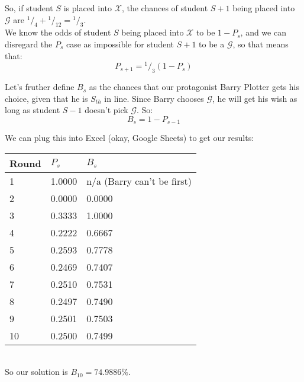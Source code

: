 \documentclass[10pt, letterpaper]{article}
\newcommand*\rfrac[2]{{}^{#1}\!/_{#2}}
\begin{document}
So, if student $S$ is placed into $\mathcal{X}$, the chances of student $S+1$ being placed into $\mathcal{G}$ are
$\rfrac{1}{4} + \rfrac{1}{12} = \rfrac{1}{3}$.\\

We know the odds of student $S$ being placed into $\mathcal{X}$ to be $1-P_s$, and we can disregard the $P_s$ case as impossible for student $S+1$ to be a $\mathcal{G}$, so that means that:
\begin{equation*}
    P_{s+1} = \rfrac{1}{3}(1 - P_s)
\end{equation*}

Let's fruther define $B_s$ as the chances that our protagonist Barry Plotter gets his choice, given that he is $S_{th}$ in line.
Since Barry chooses $\mathcal{G}$, he will get his wish as long as student $S-1$ doesn't pick $\mathcal{G}$. So:
\begin{equation*}
    B_s = 1 - P_{s-1}
\end{equation*}

We can plug this into Excel (okay, Google Sheets) to get our results:\\

\begin{tabular}{l | l | l }
    Round   & $P_s$     & $B_s$ \\ \hline
    1       & 1.0000    & n/a (Barry can't be first)\\
    2       & 0.0000    & 0.0000 \\
    3       & 0.3333    & 1.0000 \\
    4       & 0.2222    & 0.6667 \\
    5       & 0.2593    & 0.7778 \\
    6       & 0.2469    & 0.7407 \\
    7       & 0.2510    & 0.7531 \\
    8       & 0.2497    & 0.7490 \\
    9       & 0.2501    & 0.7503 \\
    10      & 0.2500    & 0.7499 \\
\end{tabular}\\

So our solution is $B_{10} = 74.9886\%$.
\end{document}
